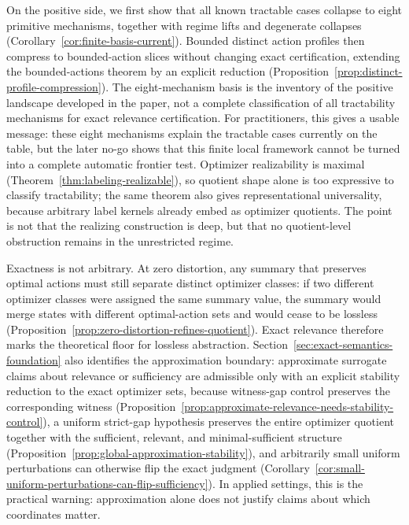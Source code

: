 On the positive side, we first show that all known tractable cases collapse to eight primitive mechanisms, together with regime lifts and degenerate collapses (Corollary~\ref{cor:finite-basis-current}). Bounded distinct action profiles then compress to bounded-action slices without changing exact certification, extending the bounded-actions theorem by an explicit reduction (Proposition~\ref{prop:distinct-profile-compression}). The eight-mechanism basis is the inventory of the positive landscape developed in the paper, not a complete classification of all tractability mechanisms for exact relevance certification. For practitioners, this gives a usable message: these eight mechanisms explain the tractable cases currently on the table, but the later no-go shows that this finite local framework cannot be turned into a complete automatic frontier test. Optimizer realizability is maximal (Theorem~\ref{thm:labeling-realizable}), so quotient shape alone is too expressive to classify tractability; the same theorem also gives representational universality, because arbitrary label kernels already embed as optimizer quotients. The point is not that the realizing construction is deep, but that no quotient-level obstruction remains in the unrestricted regime.

Exactness is not arbitrary. At zero distortion, any summary that preserves optimal actions must still separate distinct optimizer classes: if two different optimizer classes were assigned the same summary value, the summary would merge states with different optimal-action sets and would cease to be lossless (Proposition~\ref{prop:zero-distortion-refines-quotient}). Exact relevance therefore marks the theoretical floor for lossless abstraction. Section~\ref{sec:exact-semantics-foundation} also identifies the approximation boundary: approximate surrogate claims about relevance or sufficiency are admissible only with an explicit stability reduction to the exact optimizer sets, because witness-gap control preserves the corresponding witness (Proposition~\ref{prop:approximate-relevance-needs-stability-control}), a uniform strict-gap hypothesis preserves the entire optimizer quotient together with the sufficient, relevant, and minimal-sufficient structure (Proposition~\ref{prop:global-approximation-stability}), and arbitrarily small uniform perturbations can otherwise flip the exact judgment (Corollary~\ref{cor:small-uniform-perturbations-can-flip-sufficiency}). In applied settings, this is the practical warning: approximation alone does not justify claims about which coordinates matter.

